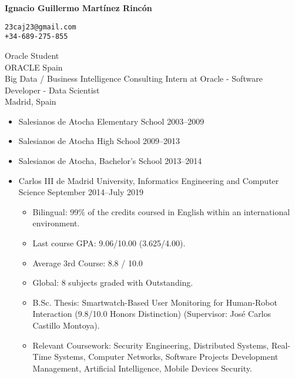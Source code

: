 \documentclass[11pt]{article}
\renewcommand{\section}[1]
{\vspace{1.0\baselineskip}{\Large\textbf{#1}}}
\begin{document}

\thispagestyle{empty}

\parbox[c][0.5in]{3.4in}{\huge \textbf{Ignacio Guillermo Martínez Rincón}}
\parbox[c][0.5in]{2.5in}{%
\small
\vspace{17ex}
\texttt{23caj23@gmail.com \\ +34-689-275-855}
}

Oracle Student \\
ORACLE Spain \\
Big Data / Business Intelligence Consulting Intern at Oracle - Software Developer - Data Scientist \\
Madrid, Spain

\section{Education}

\begin{itemize}[leftmargin=12pt]
  \item[] Salesianos de Atocha Elementary School \hfill 2003--2009
  \item[] Salesianos de Atocha High School \hfill 2009--2013
  \item[] Salesianos de Atocha, Bachelor's School \hfill 2013--2014
  \item[] Carlos III de Madrid University, Informatics Engineering and Computer Science \hfill September 2014--July 2019
  \begin{itemize}
      \item Bilingual: 99\% of the credits coursed in English within an international environment.
      \item Last course GPA: 9.06/10.00 (3.625/4.00).
      \item Average 3rd Course: 8.8 / 10.0
      \item Global: 8 subjects graded with Outstanding.
      \item B.Sc. Thesis: Smartwatch-Based User Monitoring for Human-Robot Interaction (9.8/10.0 Honors Distinction) (Supervisor: José Carlos Castillo Montoya).
      \item Relevant Coursework: Security Engineering, Distributed Systems, Real-Time Systems, Computer Networks, Software Projects Development Management, Artificial Intelligence, Mobile Devices Security.
  \end{itemize}
\end{itemize}

\section{Employment}
\end{document}
